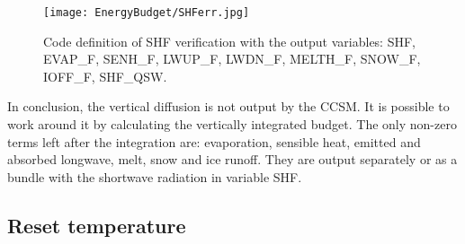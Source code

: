 \begin{appendices}
\begin{figure}[t]
\center
\texttt{[image: EnergyBudget/SHFerr.jpg]}
\caption{Code definition of SHF verification with the output variables: SHF, EVAP\_F, SENH\_F, LWUP\_F, LWDN\_F, MELTH\_F, SNOW\_F, IOFF\_F, SHF\_QSW.}
\label{shferr}
\end{figure}

In conclusion, the vertical diffusion is not output by the CCSM. It is possible to work around it by calculating the vertically integrated budget. The only non-zero terms left after the integration are: evaporation, sensible heat, emitted and absorbed longwave, melt, snow and ice runoff. They are output separately or as a bundle with the shortwave radiation in variable SHF. 





\subsection{Reset temperature}


\end{appendices}
